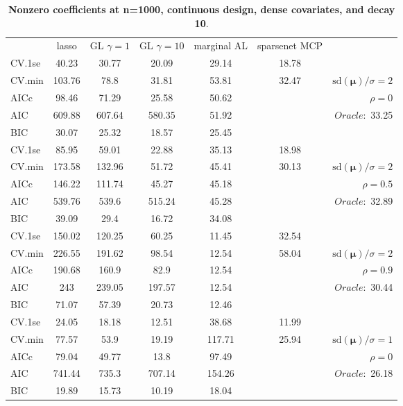 \clearpage
\begin{table}\vspace{-.5cm}
\caption[l]{ { \bf Nonzero coefficients at n=1000, continuous design, 
dense covariates, and  decay  10}.}
\vspace{-.5cm}
\footnotesize{}
\begin{center}
\begin{tabular}{l*{5}{c}|r}
& lasso & GL $\gamma=1$ & GL $\gamma=10$ & marginal AL & sparsenet MCP  & \\
 \cline{1-7}
CV.1se & 40.23 & 30.77 & 20.09 & 29.14 & 18.78 & \\
CV.min & 103.76 & 78.8 & 31.81 & 53.81 & 32.47 &  $\mathrm{sd}(\mathbf{\mu})/\sigma=2$ \\
AICc & 98.46 & 71.29 & 25.58 & 50.62 & & $\rho=0$ \\
AIC & 609.88 & 607.64 & 580.35 & 51.92 & &  \multirow{2}{*}{$Oracle: $ 33.25} \\
BIC & 30.07 & 25.32 & 18.57 & 25.45 & &  \\
 \hline 
CV.1se & 85.95 & 59.01 & 22.88 & 35.13 & 18.98 & \\
CV.min & 173.58 & 132.96 & 51.72 & 45.41 & 30.13 &  $\mathrm{sd}(\mathbf{\mu})/\sigma=2$ \\
AICc & 146.22 & 111.74 & 45.27 & 45.18 & & $\rho=0.5$ \\
AIC & 539.76 & 539.6 & 515.24 & 45.28 & &  \multirow{2}{*}{$Oracle: $ 32.89} \\
BIC & 39.09 & 29.4 & 16.72 & 34.08 & &  \\
 \hline 
CV.1se & 150.02 & 120.25 & 60.25 & 11.45 & 32.54 & \\
CV.min & 226.55 & 191.62 & 98.54 & 12.54 & 58.04 &  $\mathrm{sd}(\mathbf{\mu})/\sigma=2$ \\
AICc & 190.68 & 160.9 & 82.9 & 12.54 & & $\rho=0.9$ \\
AIC & 243 & 239.05 & 197.57 & 12.54 & &  \multirow{2}{*}{$Oracle: $ 30.44} \\
BIC & 71.07 & 57.39 & 20.73 & 12.46 & &  \\
 \hline 
CV.1se & 24.05 & 18.18 & 12.51 & 38.68 & 11.99 & \\
CV.min & 77.57 & 53.9 & 19.19 & 117.71 & 25.94 &  $\mathrm{sd}(\mathbf{\mu})/\sigma=1$ \\
AICc & 79.04 & 49.77 & 13.8 & 97.49 & & $\rho=0$ \\
AIC & 741.44 & 735.3 & 707.14 & 154.26 & &  \multirow{2}{*}{$Oracle: $ 26.18} \\
BIC & 19.89 & 15.73 & 10.19 & 18.04 & &  \\

\end{tabular}
\end{center}
\end{table}
